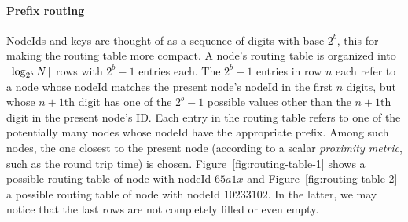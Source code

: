 \documentclass[a4paper,12pt]{article}
\DeclarePairedDelimiter{\ceil}{\lceil}{\rceil}
\begin{document}
\paragraph{Prefix routing}
NodeIds and keys are thought of as a sequence of digits with base $2^b$, this for making the routing table more compact. A node's routing table is organized into $\ceil{\log_{2^b}N}$ rows with $2^b - 1$ entries each. The $2^b - 1$ entries in row $n$ each refer to a node whose nodeId matches the present node's nodeId in the first $n$ digits, but whose $n + 1$th digit has one of the $2^b - 1$ possible values other than the $n + 1$th digit in the present node's ID. Each entry in the routing table refers to one of the potentially many nodes whose nodeId have the appropriate prefix. Among such nodes, the one closest to the present node (according to a scalar \textit{proximity metric}, such as the round trip time) is chosen. Figure~\ref{fig:routing-table-1} shows a possible routing table of node with nodeId $65a1x$ and Figure~\ref{fig:routing-table-2} a possible routing table of node with nodeId $10233102$. In the latter, we may notice that the last rows are not completely filled or even empty.

\begin{figure}[t]
  \centering

\end{figure}
\end{document}
